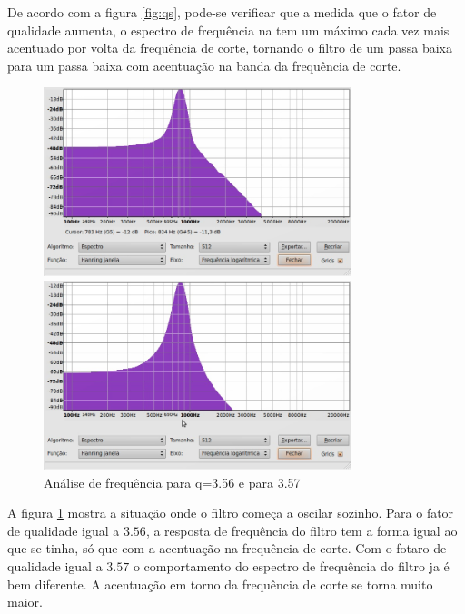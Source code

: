 \documentclass{article}
\begin{document}
De acordo com a figura \ref{fig:qs}, pode-se verificar que a medida que o fator de qualidade aumenta, o espectro de frequência na tem um
 máximo cada vez mais acentuado por volta da frequência de corte, tornando o filtro de um passa baixa para um passa baixa com acentuação na 
banda da frequência de corte.



\begin{figure}
  \centering
\parbox{2in}{
    \centering
    \includegraphics[width=0.8\textwidth,natwidth=610,natheight=642]{q356.jpg}
    }%
\qquad	  
\parbox{2in}{
      \centering
      \includegraphics[width=0.8\textwidth,natwidth=610,natheight=642]{q357.jpg}
      }%

  \caption{Análise de frequência para q=3.56 e para 3.57}
  \label{fig:qs2}
\end{figure}


A figura \ref{fig:qs2} mostra a situação onde o filtro começa a oscilar sozinho. Para o fator de qualidade igual a $3.56$, a resposta de frequência
do filtro tem a forma igual ao que se tinha, só que com a acentuação na frequência de corte. Com o fotaro de qualidade igual a $3.57$ o comportamento 
do espectro de frequência  do filtro ja é bem diferente. A acentuação em torno da frequência de corte se torna muito maior. 
\end{document}
